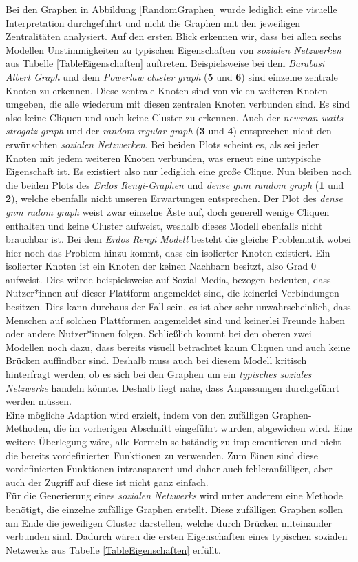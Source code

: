 Bei den Graphen in Abbildung \ref{RandomGraphen} wurde lediglich eine visuelle Interpretation durchgeführt und nicht die Graphen mit den jeweiligen Zentralitäten analysiert. Auf den ersten Blick erkennen wir, dass bei allen sechs Modellen Unstimmigkeiten zu typischen Eigenschaften von \textit{sozialen Netzwerken} aus Tabelle \ref{TableEigenschaften} auftreten. Beispielsweise bei dem \textit{Barabasi Albert Graph} und dem \textit{Powerlaw cluster graph} (\textbf{5} und \textbf{6}) sind einzelne zentrale Knoten zu erkennen. Diese zentrale Knoten sind von vielen weiteren Knoten umgeben, die alle wiederum mit diesen zentralen Knoten verbunden sind. Es sind also keine Cliquen und auch keine Cluster zu erkennen. Auch der \textit{newman watts strogatz graph} und der \textit{random regular graph} (\textbf{3} und \textbf{4}) entsprechen nicht den erwünschten \textit{sozialen Netzwerken}. Bei beiden Plots scheint es, als sei jeder Knoten mit jedem weiteren Knoten verbunden, was erneut eine untypische Eigenschaft ist. Es existiert also nur lediglich eine große Clique. Nun bleiben noch die beiden Plots des \textit{Erdos Renyi-Graphen} und \textit{dense gnm random graph} (\textbf{1} und \textbf{2}), welche ebenfalls nicht unseren Erwartungen entsprechen. Der Plot des \textit{dense gnm radom graph} weist zwar einzelne Äste auf, doch generell wenige Cliquen enthalten und keine Cluster aufweist, weshalb dieses Modell ebenfalls nicht brauchbar ist. Bei dem \textit{Erdos Renyi Modell} besteht die gleiche Problematik wobei hier noch das Problem hinzu kommt, dass ein isolierter Knoten existiert. Ein isolierter Knoten ist ein Knoten der keinen Nachbarn besitzt, also Grad $0$ aufweist.
Dies würde beispielsweise auf Sozial Media, bezogen bedeuten, dass Nutzer*innen auf dieser Plattform angemeldet sind, die keinerlei Verbindungen besitzen. Dies kann durchaus der Fall sein, es ist aber sehr unwahrscheinlich, dass Menschen auf solchen Plattformen angemeldet sind und keinerlei Freunde haben oder andere Nutzer*innen folgen.
\newpage
Schließlich kommt bei den oberen zwei Modellen noch dazu, dass bereits visuell betrachtet kaum Cliquen und auch keine Brücken auffindbar sind. Deshalb muss auch bei diesem Modell kritisch hinterfragt werden, ob es sich bei den Graphen um ein \textit{typisches soziales Netzwerke} handeln könnte. Deshalb liegt nahe, dass Anpassungen durchgeführt werden müssen.\\


Eine mögliche Adaption wird erzielt, indem von den zufälligen Graphen-Methoden, die im vorherigen Abschnitt eingeführt wurden, abgewichen wird. Eine weitere Überlegung wäre, alle Formeln selbständig zu implementieren und nicht die bereits vordefinierten Funktionen zu verwenden. Zum Einen sind diese vordefinierten Funktionen intransparent und daher auch fehleranfälliger, aber auch der Zugriff auf diese ist nicht ganz einfach. \\
Für die Generierung eines \textit{sozialen Netzwerks} wird unter anderem eine Methode benötigt, die einzelne zufällige Graphen erstellt. Diese zufälligen Graphen sollen am Ende die jeweiligen Cluster darstellen, welche durch Brücken miteinander verbunden sind. Dadurch wären die ersten Eigenschaften eines typischen sozialen Netzwerks aus Tabelle \ref{TableEigenschaften} erfüllt.

